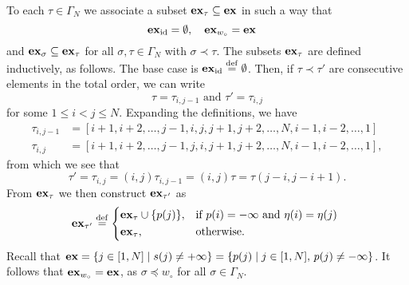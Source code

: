 To each $\tau \in \Gamma_N$ we associate a subset $\mathbf{ex}_\tau \subseteq \mathbf{ex}$ in such a way that
\begin{equation*}
	\mathbf{ex}_{\operatorname{id}} = \emptyset, \quad \mathbf{ex}_{w_\circ} = \mathbf{ex} \quad
\end{equation*}
%
and $\mathbf{ex}_\sigma \subseteq \mathbf{ex}_\tau$ for all $\sigma, \tau \in \Gamma_N$ with $\sigma
	\prec \tau$. The subsets $\mathbf{ex}_\tau$ are defined inductively, as follows. The base case
is $\mathbf{ex}_{\operatorname{id}} \overset{\mathrm{def}}{=} \emptyset$. Then, if $\tau \prec \tau'$ are consecutive elements
in the total order, we can write
\begin{equation*}
	\tau = \tau_{i,j-1} \text{ and } \tau' = \tau_{i,j}
\end{equation*}
%
for some $1 \leq i < j \leq N$. Expanding the definitions, we have
\begin{align*}
	\tau_{i, j-1} & = [i+1, i+2, \dots, j - 1, i , j, j+1, j+2, \dots, N, i-1, i-2, \dots, 1] \\
	\tau_{i, j}   & = [i+1, i+2, \dots,j-1,  j, i , j+1, j+2, \dots, N, i-1, i-2, \dots, 1],
\end{align*}
%
from which we see that
\begin{equation*}
	\tau' = \tau_{i,j} = (i, j)\tau_{i, j-1} = (i, j)\tau = \tau(j-i, j-i+1).
\end{equation*}
%
From $\mathbf{ex}_\tau$ we then construct $\mathbf{ex}_{\tau'}$ as
\begin{equation*}
	\ex_{\tau'} \defeq \begin{dcases*}
		\ex_\tau \cup \{p(j)\}, & if $p(i) = -\infty$ and $\eta(i) = \eta(j)$ \\
		\ex_\tau,               & otherwise.
	\end{dcases*}
\end{equation*}
%
Recall that $\mathbf{ex} = \{j \in [1, N] \mid s(j) \neq + \infty \} = \{p(j) \mid j \in [1,
		N],\, p(j) \neq -\infty\}$. It follows that $\mathbf{ex}_{w_\circ} = \mathbf{ex}$, as $\sigma \preceq
	w_\circ$ for all $\sigma\in \Gamma_N$.

